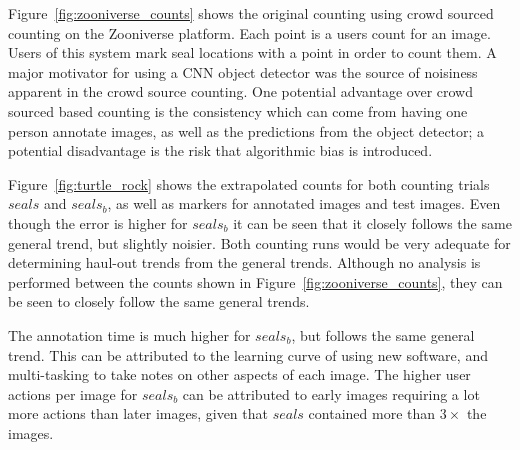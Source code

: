   Figure~\ref{fig:zooniverse_counts} shows the original counting using crowd sourced counting on the Zooniverse \cite{Zooniverse} platform. Each point is a users count for an image. Users of this system mark seal locations with a point in order to count them. A major motivator for using a \gls{CNN} object detector was the source of noisiness apparent in the crowd source counting. One potential advantage over crowd sourced based counting is the consistency which can come from having one person annotate images, as well as the predictions from the object detector; a potential disadvantage is the risk that algorithmic bias is introduced.
  
  Figure~\ref{fig:turtle_rock} shows the extrapolated counts for both counting trials $seals$ and $seals_b$, as well as markers for annotated images and test images. Even though the error is higher for $seals_b$ it can be seen that it closely follows the same general trend, but slightly noisier. Both counting runs would be very adequate for determining haul-out trends from the general trends. Although no analysis is performed between the counts shown in Figure~\ref{fig:zooniverse_counts}, they can be seen to closely follow the same general trends.
  
  The annotation time is much higher for $seals_b$, but follows the same general trend. This can be attributed to the learning curve of using new software, and multi-tasking to take notes on other aspects of each image. The higher user actions per image for $seals_b$ can be attributed to early images requiring a lot more actions than later images, given that $seals$ contained more than $3\times$ the images.


